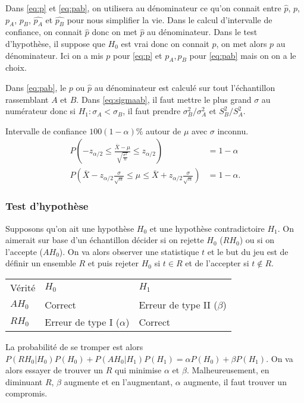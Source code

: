 Dans \eqref{eq:p} et \eqref{eq:pab}, on utilisera au dénominateur ce qu'on connait
entre $\hat{p}$, $p$, $p_A$, $p_B$, $\hat{p_A}$ et $\hat{p_B}$ pour nous simplifier la vie.
Dans le calcul d'intervalle de confiance, on connait $\hat{p}$ donc on met $\hat{p}$
au dénominateur.
Dans le test d'hypothèse, il suppose que $H_0$ est vrai donc on connait $p$,
on met alors $p$ au dénominateur.
Ici on a mis $p$ pour \eqref{eq:p} et $p_A,p_B$ pour \eqref{eq:pab} mais on
on a le choix.

Dans \eqref{eq:pab}, le $p$ ou $\hat{p}$ au dénominateur est calculé sur tout
l'échantillon rassemblant $A$ et $B$.
Dans \eqref{eq:sigmaab}, il faut mettre le plus grand $\sigma$ au numérateur donc
si $H_1: \sigma_A < \sigma_B$, il faut prendre $\sigma_B^2/\sigma_A^2$ et $S_B^2/S_A^2$.

\begin{myexem}
  Intervalle de confiance $100(1-\alpha)\%$ autour de $\mu$ avec $\sigma$ inconnu.
  \begin{align*}
    P(-z_{\alpha/2} \leq \frac{\bar{X}-\mu}{\sqrt{\frac{\sigma^2}{n}}} \leq z_{\alpha/2}) & = 1 - \alpha\\
    P(\bar{X}-z_{\alpha/2}\frac{\sigma}{\sqrt{n}} \leq \mu \leq \bar{X}+z_{\alpha/2}\frac{\sigma}{\sqrt{n}}) & = 1 - \alpha.
  \end{align*}
\end{myexem}

\subsubsection{Test d'hypothèse}
Supposons qu'on ait une hypothèse $H_0$ et une hypothèse contradictoire $H_1$.
On aimerait sur base d'un échantillon décider si on rejette $H_0$ ($RH_0$) ou si on l'accepte ($AH_0$).
On va alors observer une statistique $t$ et le but du jeu est de définir
un ensemble $R$ et puis rejeter $H_0$ si $t \in R$ et de l'accepter si $t \notin R$.
\begin{center}
  \begin{tabular}{lll}
    Vérité & $H_0$ & $H_1$\\
    $AH_0$ & Correct & Erreur de type II ($\beta$)\\
    $RH_0$ & Erreur de type I ($\alpha$) & Correct
  \end{tabular}
\end{center}
La probabilité de se tromper est alors
$P(RH_0|H_0)P(H_0) + P(AH_0|H_1)P(H_1) = \alpha P(H_0) + \beta P(H_1)$.
On va alors essayer de trouver un $R$ qui minimise $\alpha$ et $\beta$.
Malheureusement, en diminuant $R$, $\beta$ augmente et en l'augmentant, $\alpha$ augmente,
il faut trouver un compromis.

